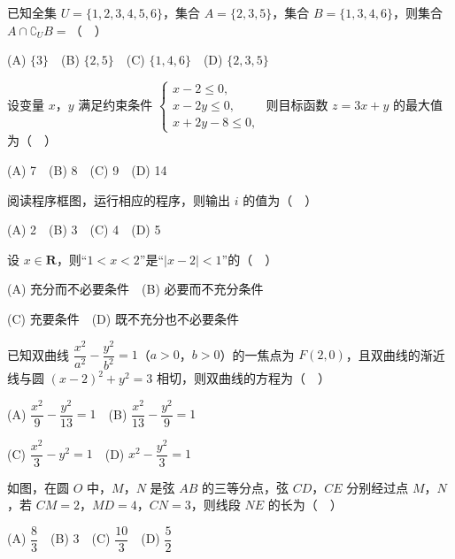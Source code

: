 \begin{question}
已知全集 \(U=\{1,2,3,4,5,6\}\)，集合 \(A=\{2,3,5\}\)，集合 \(B=\{1,3,4,6\}\)，则集合 \(A\cap\complement_U B=\)（　）

(A) \(\{3\}\)　(B) \(\{2,5\}\)　(C) \(\{1,4,6\}\)　(D) \(\{2,3,5\}\)

\end{question}
\begin{question}
设变量 \(x\)，\(y\) 满足约束条件 \(\begin{cases}x-2\leqslant0,\\x-2y\leqslant0,\\x+2y-8\leqslant0,\end{cases}\) 则目标函数 \(z=3x+y\) 的最大值为（　）

(A) 7　(B) 8　(C) 9　(D) 14

\Needspace{0.4\textheight}
\end{question}
\begin{question}
阅读程序框图，运行相应的程序，则输出 \(i\) 的值为（　）
\nopagebreak[4]
\begin{center}\end{center}
\nopagebreak[4]
(A) 2　(B) 3　(C) 4　(D) 5

\end{question}
\begin{question}
设 \(x\in\mathbf{R}\)，则“\(1<x<2\)”是“\(|x-2|<1\)”的（　）

(A) 充分而不必要条件　(B) 必要而不充分条件

(C) 充要条件　(D) 既不充分也不必要条件

\end{question}
\begin{question}
已知双曲线 \(\dfrac{x^2}{a^2}-\dfrac{y^2}{b^2}=1\)（\(a>0\)，\(b>0\)）的一焦点为 \(F(2,0)\)，且双曲线的渐近线与圆 \((x-2)^2+y^2=3\) 相切，则双曲线的方程为（　）

(A) \(\dfrac{x^2}{9}-\dfrac{y^2}{13}=1\)　(B) \(\dfrac{x^2}{13}-\dfrac{y^2}{9}=1\)

(C) \(\dfrac{x^2}{3}-y^2=1\)　(D) \(x^2-\dfrac{y^2}{3}=1\)

\Needspace{0.4\textheight}
\end{question}
\begin{question}
如图，在圆 \(O\) 中，\(M\)，\(N\) 是弦 \(AB\) 的三等分点，弦 \(CD\)，\(CE\) 分别经过点 \(M\)，\(N\)，若 \(CM=2\)，\(MD=4\)，\(CN=3\)，则线段 \(NE\) 的长为（　）
\nopagebreak[4]
\begin{center}\end{center}
\nopagebreak[4]
(A) \(\dfrac{8}{3}\)　(B) 3　(C) \(\dfrac{10}{3}\)　(D) \(\dfrac{5}{2}\)

\end{question}
